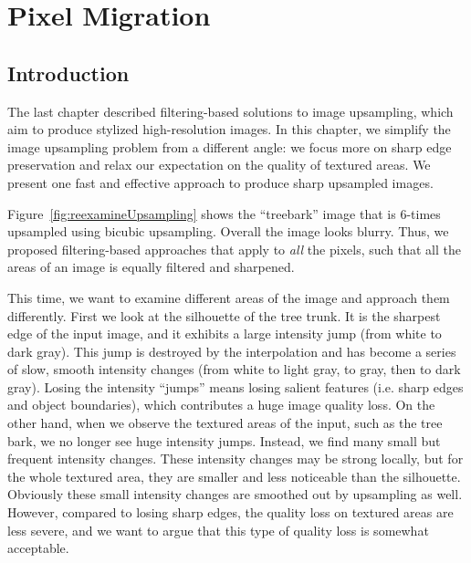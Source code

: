 \chapter{Pixel Migration}\label{chap:migration}



\section{Introduction}\label{PM:intro}
The last chapter described filtering-based solutions to image upsampling, which aim to produce stylized high-resolution images. In this chapter, we simplify the image upsampling problem from a different angle: we focus more on sharp edge preservation and relax our expectation on the quality of textured areas. We present one fast and effective approach to produce sharp upsampled images.  

Figure~\ref{fig:reexamineUpsampling} shows the “treebark” image that is 6-times upsampled using bicubic upsampling. Overall the image looks blurry. Thus, we proposed filtering-based approaches that apply to \textit{all} the pixels, such that all the areas of an image is equally filtered and sharpened. 

This time, we want to examine different areas of the image and approach them differently. First we look at the silhouette of the tree trunk. It is the sharpest edge of the input image, and it exhibits a large intensity jump (from white to dark gray). This jump is destroyed by the interpolation and has become a series of slow, smooth intensity changes (from white to light gray, to gray, then to dark gray). Losing the intensity “jumps” means losing salient features (i.e. sharp edges and object boundaries), which contributes a huge image quality loss. On the other hand, when we observe the textured areas of the input, such as the tree bark, we no longer see huge intensity jumps. Instead, we find many small but frequent intensity changes. These intensity changes may be strong locally, but for the whole textured area, they are smaller and less noticeable than the silhouette. Obviously these small intensity changes are smoothed out by upsampling as well. However, compared to losing sharp edges, the quality loss on textured areas are less severe, and we want to argue that this type of quality loss is somewhat acceptable. 

